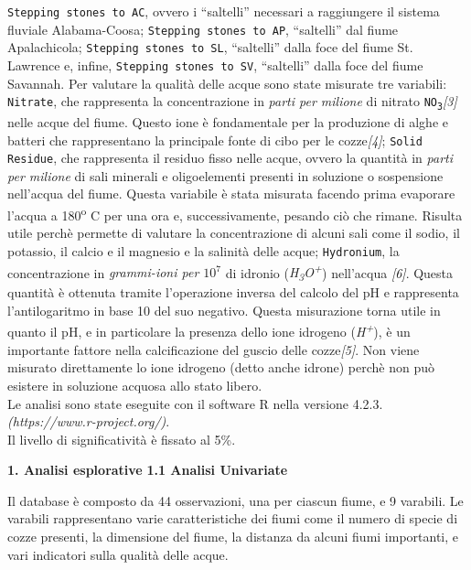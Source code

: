 \documentclass{article} %
\begin{document}
\texttt{Stepping stones to AC}, ovvero i “saltelli” necessari a raggiungere il sistema fluviale Alabama-Coosa; 
\texttt{Stepping stones to AP}, “saltelli” dal fiume Apalachicola; 
\texttt{Stepping stones to SL}, “saltelli” dalla foce del fiume St. Lawrence e, infine, 
\texttt{Stepping stones to SV}, “saltelli” dalla foce del fiume Savannah.
Per valutare la qualità delle acque sono state misurate tre variabili: 
\texttt{Nitrate}, che rappresenta la concentrazione in \textit{parti per milione} di nitrato \texttt{NO\textsubscript{3}}\textit{[3]} nelle acque del fiume. Questo ione è fondamentale per la produzione di alghe e batteri che rappresentano la principale fonte di cibo per le cozze\textit{[4]}; 
\texttt{Solid Residue}, che rappresenta il residuo fisso nelle acque, ovvero la quantità in \textit{parti per milione} di sali minerali e oligoelementi presenti in soluzione o sospensione nell'acqua del fiume. Questa variabile è stata misurata facendo prima evaporare l'acqua a 180\textsuperscript{o} C per una ora e, successivamente, pesando ciò che rimane. Risulta utile perchè permette di valutare la concentrazione di alcuni sali come il sodio, il potassio, il calcio e il magnesio e la salinità delle acque; 
\texttt{Hydronium}, la concentrazione in \textit{grammi-ioni per $10^7$} di idronio (\textit{H\textsubscript{3}O\textsuperscript{+}}) nell'acqua \textit{[6]}. Questa quantità è ottenuta tramite l'operazione inversa del calcolo del pH e rappresenta l'antilogaritmo in base 10 del suo negativo. Questa misurazione torna utile in quanto il pH, e in particolare la presenza dello ione idrogeno (\textit{H\textsuperscript{+}}), è un importante fattore nella calcificazione del guscio delle cozze\textit{[5]}. Non viene misurato direttamente lo ione idrogeno (detto anche idrone) perchè non può esistere in soluzione acquosa allo stato libero. \\
Le analisi sono state eseguite con il software R nella versione 4.2.3.\\\textit{(https://www.r-project.org/)}.\\ Il livello di significatività è fissato al 5\%.
\vskip 55pt 

\begin{flushleft}
    \textbf{\Huge 1. \: Analisi esplorative}
    \vskip 30pt
    \textbf{\Large 1.1 \: Analisi Univariate}
\end{flushleft}
\vskip 10pt

Il database è composto da 44 osservazioni, una per ciascun fiume, e 9 varabili. 
Le varabili rappresentano varie caratteristiche dei fiumi come il numero di specie di cozze presenti, la dimensione del fiume, la distanza da alcuni fiumi importanti, e vari indicatori sulla qualità delle acque.\\
\end{document}
